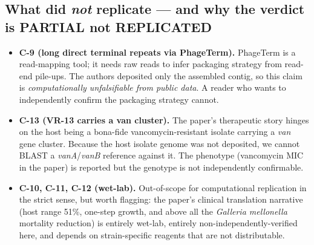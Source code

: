 \documentclass[11pt,letterpaper]{article}
\begin{document}
\subsection*{What did \emph{not} replicate --- and why the verdict is PARTIAL not REPLICATED}
\begin{itemize}[leftmargin=1.2cm]
  \item \textbf{C-9 (long direct terminal repeats via PhageTerm).} PhageTerm is a read-mapping tool; it needs raw reads to infer packaging strategy from read-end pile-ups. The authors deposited only the assembled contig, so this claim is \emph{computationally unfalsifiable from public data}. A reader who wants to independently confirm the packaging strategy cannot.
  \item \textbf{C-13 (VR-13 carries a van cluster).} The paper's therapeutic story hinges on the host being a bona-fide vancomycin-resistant isolate carrying a \textit{van} gene cluster. Because the host isolate genome was not deposited, we cannot BLAST a \textit{vanA}/\textit{vanB} reference against it. The phenotype (vancomycin MIC in the paper) is reported but the genotype is not independently confirmable.
  \item \textbf{C-10, C-11, C-12 (wet-lab).} Out-of-scope for computational replication in the strict sense, but worth flagging: the paper's clinical translation narrative (host range 51\%, one-step growth, and above all the \textit{Galleria mellonella} mortality reduction) is entirely wet-lab, entirely non-independently-verified here, and depends on strain-specific reagents that are not distributable.
\end{itemize}
\end{document}
